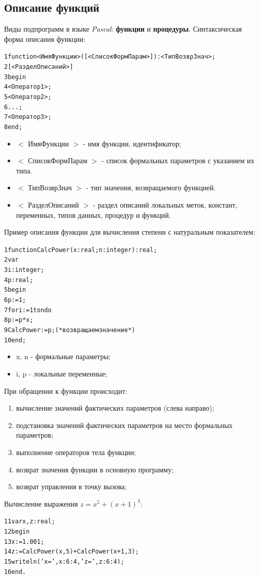 \documentclass{beamer}
\begin{document}
\subsection{Описание функций}
\begin{frame}[fragile]
Виды подпрограмм в языке \textit{Pascal}: \textbf{функции} и \textbf{процедуры}. Синтаксическая форма описания функции:
\begin{alltt}
1 function <ИмяФункции>([<СписокФормПарам>]):<ТипВозврЗнач>;
2     [<РазделОписаний>]
3 begin
4   <Оператор1>;
5   <Оператор2>;
6   ...;
7   <Оператор3>;
8 end;
\end{alltt}
\begin{itemize}
\item $<$ ИмяФункции $>$ - имя функции, идентификатор;
\item $<$ СписокФормПарам $>$ - список формальных параметров с указанием их типа.
\item $<$ ТипВозврЗнач $>$ - тип значения, возвращаемого функцией.
\item $<$ РазделОписаний $>$ - раздел описаний локальных меток, констант, переменных, типов данных, процедур и функций.
\end{itemize}
\end{frame}

\begin{frame}[fragile]
Пример описания функции для вычисления степени с натуральным показателем:
\begin{alltt}
1 function CalcPower(x: real; n: integer):real;
2 var 
3   i: integer;
4   p: real;
5 begin
6   p := 1;
7   for i := 1 to n do 
8       p := p * x;
9   CalcPower := p; (*возвращаем значение*)
10 end;
\end{alltt}
\begin{itemize}
\item x, n - формальные параметры;
\item i, p - локальные переменные;
\end{itemize}
\end{frame}

\begin{frame}[fragile]
При обращении к функции происходит:
\begin{enumerate}
\item вычисление значений фактических параметров (слева направо);
\item подстановка значений фактических параметров на место формальных параметров;
\item выполнение операторов тела функции;
\item возврат значения функции в основную программу;
\item возврат управления в точку вызова;
\end{enumerate}
Вычисление выражения $z = x^{5} + (x+1)^{3}$:
\begin{alltt}
11 var x, z: real; 
12 begin
13   x := 1.001;
14   z := CalcPower(x, 5) + CalcPower(x+1, 3);
15   writeln('x=', x:6:4, 'z=', z:6:4);
16 end.
\end{alltt}
\end{frame}
\end{document}

